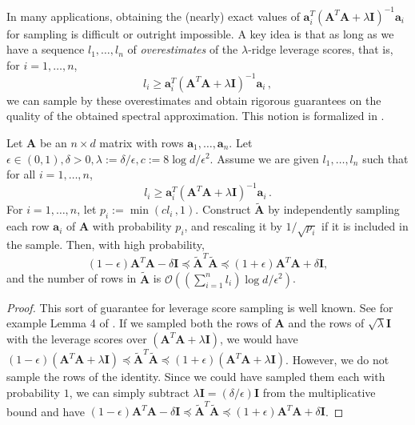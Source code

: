 \documentclass{toc}
\newcommand{\Oh}{\ensuremath{\mathcal{O}}}
\newcommand{\bv}[1]{\mathbf{#1}}
\begin{document}
In many applications, obtaining the (nearly) exact values of $\bv{a}_i^T (\bv{A}^T\bv{A} + \lambda \bv{I})^{-1} \bv{a}_i$ for sampling is difficult or outright impossible.
A key idea is that as long as we have a sequence $l_1, \ldots, l_n$ of \emph{overestimates} of the $\lambda$-ridge leverage scores, that is, for $i=1,\ldots,n$,
$$
    l_i \geq \bv{a}_i^T (\bv{A}^T\bv{A} + \lambda \bv{I})^{-1} \bv{a}_i\,,
$$
we can sample by these overestimates and obtain rigorous guarantees on the quality of the obtained spectral approximation.
This notion is formalized in .

\begin{theorem}
    \label{thm:leverage_sampling}
    Let $\bv{A}$ be an $n \times d$ matrix with rows $\bv{a}_1, \ldots, \bv{a}_n$.
    Let $\epsilon \in (0, 1), \delta > 0, \lambda := \delta / \epsilon, c := 8 \log d / \epsilon^2$.
    Assume we are given $l_1, \ldots, l_n$ such that for all $i = 1, \ldots, n$,
    $$
        l_i \geq \bv{a}_i^T (\bv{A}^T \bv{A} + \lambda \bv{I})^{-1} \bv{a}_i\,.
    $$
    For $i = 1, \ldots, n$, let
    $
        p_i := \min(cl_i\,, 1).
    $
    Construct $\bv{\tilde{A}}$ by independently sampling each row $\bv{a}_i$ of $\bv{A}$ with probability $p_i$, and rescaling it by $1 / \sqrt{p_i}$ if it is included in the sample.
    Then, with high probability,
    $$
        (1-\epsilon)\bv{A}^T\bv{A} - \delta\bv{I} \preceq \bv{\tilde{A}}^T\bv{\tilde{A}} \preceq (1+\epsilon)\bv{A}^T\bv{A} + \delta\bv{I},
    $$
    and the number of rows in $\bv{\tilde{A}}$ is $\Oh\left(\left(\sum_{i=1}^n l_i\right) \log d / \epsilon^2\right)$.
\end{theorem}
\begin{proof}
This sort of guarantee for leverage score sampling is well known. See for example Lemma 4 of \cite{cohen2015uniform}. If we sampled both the rows of $\bv{A}$ and the rows of $\sqrt{\lambda} \bv{I}$ with the leverage scores over $(\bv{A}^T\bv{A} + \lambda \bv I)$, we would have $(1-\epsilon)(\bv{A}^T\bv{A} + \lambda \bv I) \preceq \bv{\tilde A}^T \bv{\tilde A} \preceq(1+\epsilon)(\bv{A}^T\bv{A} + \lambda \bv I)$. However, we do not sample the rows of the identity. Since we could have sampled them each with probability $1$, we can simply subtract $\lambda \bv I = (\delta/\epsilon) \bv I$ from the multiplicative bound and have
%
$(1-\epsilon)\bv{A}^T\bv{A} - \delta\bv{I} \preceq \bv{\tilde{A}}^T\bv{\tilde{A}} \preceq (1+\epsilon)\bv{A}^T\bv{A} + \delta\bv{I}$.
\end{proof}
\end{document}
